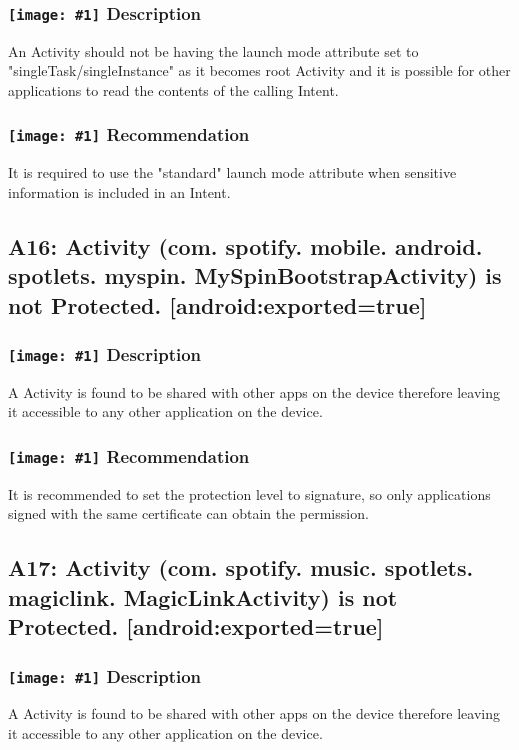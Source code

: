 \documentclass[12p]{article}
\newcommand{\icon}[1]{\texttt{[image: \#1]}}
\begin{document}
\subsubsection*{\protect\icon{/home/miki/Documents/GITHUB/AndroidPermissions/python/vulns/report_icons/basic_sheet.png} Description}
An Activity should not be having the launch mode attribute set to "singleTask/singleInstance" as it becomes root Activity and it is possible for other applications to read the contents of the calling Intent.
\subsubsection*{\protect\icon{/home/miki/Documents/GITHUB/AndroidPermissions/python/vulns/report_icons/basic_todo.png} Recommendation}
It is required to use the "standard" launch mode attribute when sensitive information is included in an Intent.
\subsection{A16: Activity (com. spotify. mobile. android. spotlets. myspin. MySpinBootstrapActivity) is not Protected. [android:exported=true]}
\subsubsection*{\protect\icon{/home/miki/Documents/GITHUB/AndroidPermissions/python/vulns/report_icons/basic_sheet.png} Description}
A Activity is found to be shared with other apps on the device therefore leaving it accessible to any other application on the device.
\subsubsection*{\protect\icon{/home/miki/Documents/GITHUB/AndroidPermissions/python/vulns/report_icons/basic_todo.png} Recommendation}
It is recommended to set the protection level to signature, so only applications signed with the same certificate can obtain the permission.
\subsection{A17: Activity (com. spotify. music. spotlets. magiclink. MagicLinkActivity) is not Protected. [android:exported=true]}
\subsubsection*{\protect\icon{/home/miki/Documents/GITHUB/AndroidPermissions/python/vulns/report_icons/basic_sheet.png} Description}
A Activity is found to be shared with other apps on the device therefore leaving it accessible to any other application on the device.
\end{document}
